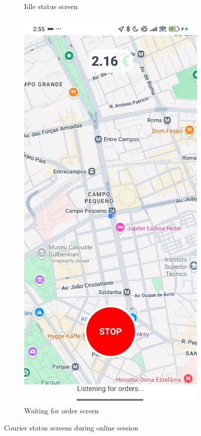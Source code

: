 \begin{figure}[H]
\begin{subfigure}[b]{0.44\textwidth}
        \caption{Idle status screen}
        \label{fig:go_screen}
    \end{subfigure}
    \hfill
    \begin{subfigure}[b]{0.44\textwidth}
        \centering
        \includegraphics[width=\textwidth]{images/waiting_screen.jpeg}
        \caption{Waiting for order screen}
        \label{fig:waiting_screen}
    \end{subfigure}
    \caption{Courier status screens during online session}
    \label{fig:courier_status}
\end{figure}

